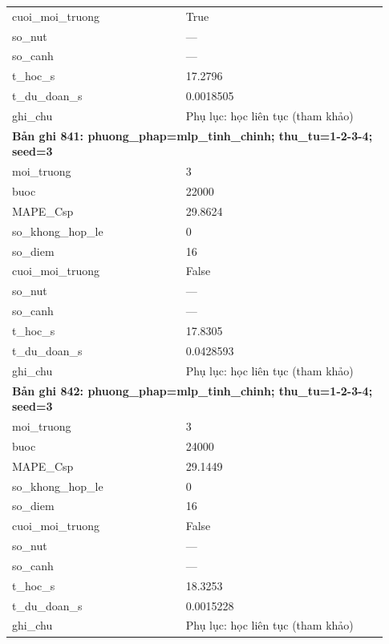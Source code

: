 \begin{longtable}{p{0.43\linewidth}p{0.50\linewidth}}
cuoi\_\allowbreak moi\_\allowbreak truong & True \\
so\_\allowbreak nut & — \\
so\_\allowbreak canh & — \\
t\_\allowbreak hoc\_\allowbreak s & 17.2796 \\
t\_\allowbreak du\_\allowbreak doan\_\allowbreak s & 0.0018505 \\
ghi\_\allowbreak chu & Phụ lục: học liên tục (tham khảo) \\
\midrule
\multicolumn{2}{p{0.95\linewidth}}{\textbf{Bản ghi 841: phuong\_phap=mlp\_tinh\_chinh; thu\_tu=1-2-3-4; seed=3}} \\
moi\_\allowbreak truong & 3 \\
buoc & 22000 \\
MAPE\_\allowbreak Csp & 29.8624 \\
so\_\allowbreak khong\_\allowbreak hop\_\allowbreak le & 0 \\
so\_\allowbreak diem & 16 \\
cuoi\_\allowbreak moi\_\allowbreak truong & False \\
so\_\allowbreak nut & — \\
so\_\allowbreak canh & — \\
t\_\allowbreak hoc\_\allowbreak s & 17.8305 \\
t\_\allowbreak du\_\allowbreak doan\_\allowbreak s & 0.0428593 \\
ghi\_\allowbreak chu & Phụ lục: học liên tục (tham khảo) \\
\midrule
\multicolumn{2}{p{0.95\linewidth}}{\textbf{Bản ghi 842: phuong\_phap=mlp\_tinh\_chinh; thu\_tu=1-2-3-4; seed=3}} \\
moi\_\allowbreak truong & 3 \\
buoc & 24000 \\
MAPE\_\allowbreak Csp & 29.1449 \\
so\_\allowbreak khong\_\allowbreak hop\_\allowbreak le & 0 \\
so\_\allowbreak diem & 16 \\
cuoi\_\allowbreak moi\_\allowbreak truong & False \\
so\_\allowbreak nut & — \\
so\_\allowbreak canh & — \\
t\_\allowbreak hoc\_\allowbreak s & 18.3253 \\
t\_\allowbreak du\_\allowbreak doan\_\allowbreak s & 0.0015228 \\
ghi\_\allowbreak chu & Phụ lục: học liên tục (tham khảo) \\

\end{longtable}
